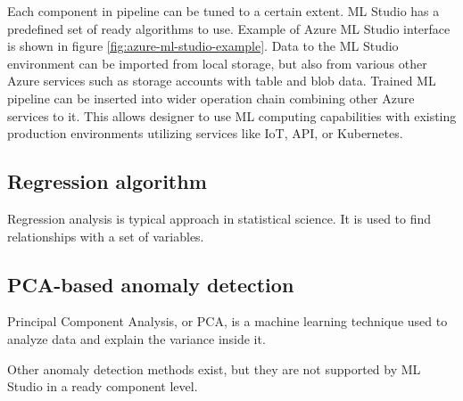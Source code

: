 Each component in pipeline can be tuned
to a certain extent.
ML Studio has a predefined set of ready algorithms to use.
Example of Azure ML Studio interface
is shown in figure \ref{fig:azure-ml-studio-example}.
Data to the ML Studio environment
can be imported from local storage,
but also from various other Azure services
such as storage accounts with table and blob data.
Trained ML pipeline can be inserted into wider operation chain
combining other Azure services to it.
This allows designer to use ML computing capabilities
with existing production environments
utilizing services like IoT, API, or Kubernetes.



\subsection{Regression algorithm}\label{subsec:bg-regression-ml}
Regression analysis is typical approach in statistical science.
It is used to find relationships with a set of variables.


\subsection{PCA-based anomaly detection}\label{subsec:bg-pca-ada}

Principal Component Analysis, or PCA,
is a machine learning technique
used to analyze data and explain the variance inside it.~\cite{azure2022pca}



Other anomaly detection methods exist, but they are not supported by ML Studio
in a ready component level. %


